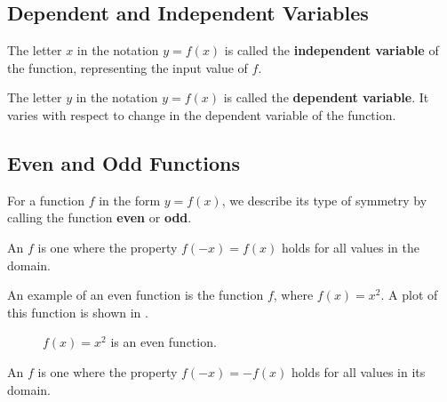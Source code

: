 \subsection{Dependent and Independent Variables}
  The letter $x$ in the notation $y=f(x)$ is called the 
  \textbf{independent variable} of the function, representing the input value 
  of $f$.

  The letter $y$ in the notation $y=f(x)$ is called the 
  \textbf{dependent variable}.
  It varies with respect to change in the dependent variable of the function.

\subsection{Even and Odd Functions}

For a function $f$ in the form $y=f(x)$, we describe its type of symmetry by 
calling the function \textbf{even} or 
\textbf{odd}.

\begin{defn}
  An  $f$
  is one where the property $f(-x)=f(x)$ holds for all values in the domain.
\end{defn}

\begin{ex}
  An example of an even function is the function $f$,
  where $f(x)=x^2$.
  A plot of this function is shown in .

  \begin{figure}
    \begin{center}
    \end{center}
    \caption{$f(x) = x^2$ is an even function.}
    \label{fig:functions:even}
  \end{figure}
\end{ex}

\begin{defn}
  An  $f$
  is one where the property $f(-x)=-f(x)$ holds for all values in its domain.
\end{defn}

